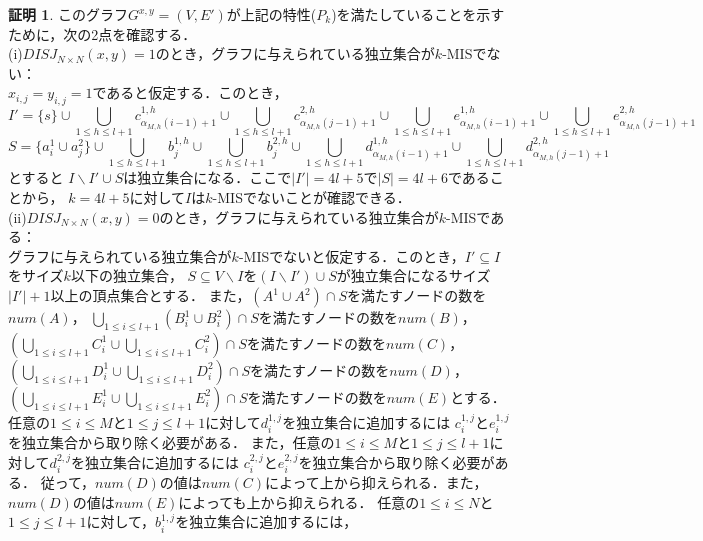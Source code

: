 \documentclass[12pt]{thesis}
\theoremstyle{definition}
\newtheorem*{prf*}{証明}
\begin{document}
\begin{prf*}
このグラフ$G^{x, y} = (V, E')$が上記の特性($P_{k}$)を満たしていることを示すために，次の2点を確認する． \\
(i)$DISJ_{N \times N} (x, y) = 1$のとき，グラフに与えられている独立集合が$k$-MISでない： \\
$x_{i,j}=y_{i,j}=1$であると仮定する．このとき，
\begin{dmath*}
I'=\{s\} \cup \bigcup_{1\leq h \leq l+1}c^{1,h}_{\alpha_{M,h}(i-1)+1} \cup 
\bigcup_{1\leq h \leq l+1}c^{2,h}_{\alpha_{M,h}(j-1)+1} \cup 
\bigcup_{1\leq h \leq l+1}e^{1,h}_{\alpha_{M,h}(i-1)+1} \cup 
\bigcup_{1\leq h \leq l+1}e^{2,h}_{\alpha_{M,h}(j-1)+1}
\end{dmath*}
\begin{dmath*}
S=\{a^{1}_{i} \cup a^{2}_{j}\} \cup 
\bigcup_{1\leq h \leq l+1}b^{1,h}_{j} \cup 
\bigcup_{1\leq h \leq l+1}b^{2,h}_{j} \cup 
\bigcup_{1\leq h \leq l+1}d^{1,h}_{\alpha_{M,h}(i-1)+1} \cup  
\bigcup_{1\leq h \leq l+1}d^{2,h}_{\alpha_{M,h}(j-1)+1}
\end{dmath*}
とすると
$I \backslash I' \cup S$は独立集合になる．ここで$|I'|=4l+5$で$|S|=4l+6$であることから，
$k=4l+5$に対して$I$は$k$-MISでないことが確認できる． \\
(ii)$DISJ_{N \times N} (x, y) = 0$のとき，グラフに与えられている独立集合が$k$-MISである： \\ 
グラフに与えられている独立集合が$k$-MISでないと仮定する．このとき，$I'\subseteq I$をサイズ$k$以下の独立集合，
$S\subseteq V\backslash I$を$(I \backslash I') \cup S$が独立集合になるサイズ$|I'|+1$以上の頂点集合とする．
また，$(A^{1}\cup A^{2}) \cap S$を満たすノードの数を$num(A)$，
$\bigcup_{1\leq i \leq l+1}(B_{i}^{1} \cup B_{i}^{2}) \cap S$を満たすノードの数を$num(B)$，
$\left(\bigcup_{1\leq i \leq l+1}C_{i}^{1} \cup \bigcup_{1\leq i \leq l+1}C_{i}^{2}\right) \cap S$を満たすノードの数を$num(C)$，
$\left(\bigcup_{1\leq i \leq l+1}D_{i}^{1} \cup \bigcup_{1\leq i \leq l+1}D_{i}^{2}\right) \cap S$を満たすノードの数を$num(D)$，\\
$\left(\bigcup_{1\leq i \leq l+1}E_{i}^{1} \cup \bigcup_{1\leq i \leq l+1}E_{i}^{2}\right) \cap S$を満たすノードの数を$num(E)$とする．
 任意の$1\leq i \leq M$と$1\leq j \leq l+1$に対して$d^{1,j}_{i}$を独立集合に追加するには
 $c^{1,j}_{i}$と$e^{1,j}_{i}$を独立集合から取り除く必要がある．
また，任意の$1\leq i \leq M$と$1\leq j \leq l+1$に対して$d^{2,j}_{i}$を独立集合に追加するには
$c^{2,j}_{i}$と$e^{2,j}_{i}$を独立集合から取り除く必要がある．
従って，$num(D)$の値は$num(C)$によって上から抑えられる．また，$num(D)$の値は$num(E)$によっても上から抑えられる．
任意の$1\leq i \leq N$と$1\leq j \leq l+1$に対して，$b^{1,j}_{i}$を独立集合に追加するには，

\end{prf*}
\end{document}
